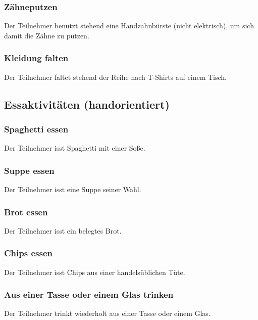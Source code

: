 \subsubsection{Zähneputzen}
Der Teilnehmer benutzt stehend eine Handzahnbürste (nicht elektrisch), um sich damit die Zähne zu putzen.
\subsubsection{Kleidung falten}
Der Teilnehmer faltet stehend der Reihe nach T-Shirts auf einem Tisch.

\subsection{Essaktivitäten (handorientiert)}
\subsubsection{Spaghetti essen}
Der Teilnehmer isst Spaghetti mit einer Soße.
\subsubsection{Suppe essen}
Der Teilnehmer isst eine Suppe seiner Wahl.
\subsubsection{Brot essen}
Der Teilnehmer isst ein belegtes Brot.
\subsubsection{Chips essen}
Der Teilnehmer isst Chips aus einer handelsüblichen Tüte.
\subsubsection{Aus einer Tasse oder einem Glas trinken}
Der Teilnehmer trinkt wiederholt aus einer Tasse oder einem Glas.